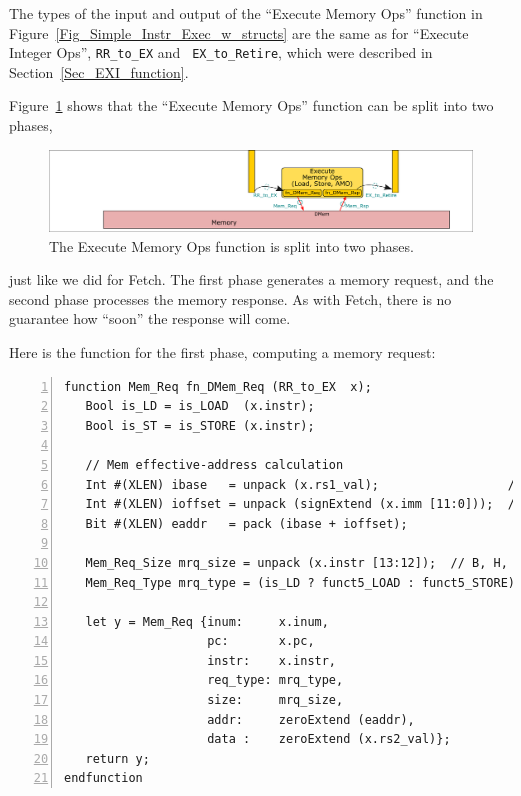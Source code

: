 \label{Sec_DMem_function}


The types of the input and output of the ``Execute Memory Ops''
function in Figure~\ref{Fig_Simple_Instr_Exec_w_structs} are the same
as for ``Execute Integer Ops'', {\ie} {\tt RR\_to\_EX} and {\tt
EX\_to\_Retire}, which were described in Section~\ref{Sec_EXI_function}.

Figure~\ref{Fig_fn_DMem} shows that the ``Execute Memory Ops''
function can be split into two phases,
\begin{figure}[htbp]
  \centerline{\includegraphics[width=6in,angle=0]{ch060/Figures/Fig_fn_DMem}}
  \caption{\label{Fig_fn_DMem}The Execute Memory Ops function is split into two phases.}
\end{figure}
just like we did for Fetch.  The first phase generates a memory
request, and the second phase processes the memory response.  As with
Fetch, there is no guarantee how ``soon'' the response will come.

Here is the function for the first phase, computing a memory request:

{\small
\begin{Verbatim}[frame=single, numbers=left]
function Mem_Req fn_DMem_Req (RR_to_EX  x);
   Bool is_LD = is_LOAD  (x.instr);
   Bool is_ST = is_STORE (x.instr);

   // Mem effective-address calculation
   Int #(XLEN) ibase   = unpack (x.rs1_val);                  // Signed
   Int #(XLEN) ioffset = unpack (signExtend (x.imm [11:0]));  // Signed
   Bit #(XLEN) eaddr   = pack (ibase + ioffset);

   Mem_Req_Size mrq_size = unpack (x.instr [13:12]);  // B, H, W or D
   Mem_Req_Type mrq_type = (is_LD ? funct5_LOAD : funct5_STORE);

   let y = Mem_Req {inum:     x.inum,
                    pc:       x.pc,
                    instr:    x.instr,
                    req_type: mrq_type,
                    size:     mrq_size,
                    addr:     zeroExtend (eaddr),
                    data :    zeroExtend (x.rs2_val)};
   return y;
endfunction
\end{Verbatim}
}

